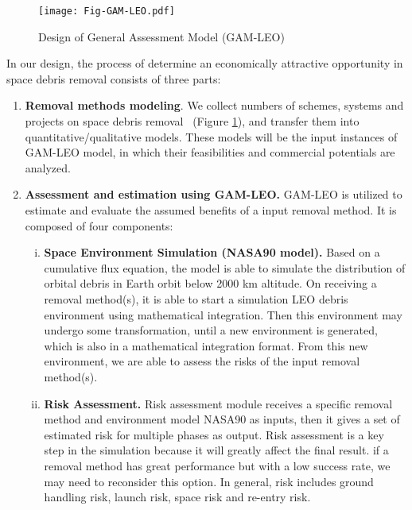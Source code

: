 \documentclass{mcmthesis}
\begin{document}
	\begin{figure}[htbp]
		\centering
		\texttt{[image: Fig-GAM-LEO.pdf]}
		\caption{Design of General Assessment Model (GAM-LEO)}
		\label{Fig-GAM_LEO}
	\end{figure}
	
	In our design, the process of determine an economically attractive opportunity in space debris removal consists of three parts:
	
	\begin{enumerate}
		
		\item \textbf{Removal methods modeling}. We collect numbers of schemes, systems and projects on space debris removal~\cite{Phipps,Pearson2010,Pardini,Visagie,Beckett} (Figure \ref{Fig-GAM_LEO}), and transfer them into quantitative/qualitative models. These models will be the input instances of GAM-LEO model, in which their feasibilities and commercial potentials are analyzed.
		
		\item \textbf{Assessment and estimation using GAM-LEO.} GAM-LEO is utilized to estimate and evaluate the assumed benefits of a input removal method. It is composed of four components:
		\begin{enumerate}[i.]
			
			\item \textbf{Space Environment Simulation (NASA90 model).} Based on a cumulative flux equation, the model is able to simulate the distribution of orbital debris in Earth orbit below 2000 km altitude. On receiving a removal method(s), it is able to start a simulation LEO debris environment using mathematical integration. Then this environment may undergo some transformation, until a new environment is generated, which is also in a mathematical integration format. From this new environment, we are able to assess the risks of the input removal method(s).
			
			\item \textbf{Risk Assessment.} Risk assessment module receives a specific removal method and environment model NASA90 as inputs, then it gives a set of estimated risk for multiple phases as output. Risk assessment is a key step in the simulation because it will greatly affect the final result. if a removal method has great performance but with a low success rate, we may need to reconsider this option. In general, risk includes ground handling risk, launch risk, space risk and re-entry risk.
			

\end{enumerate}
\end{enumerate}
\end{document}
